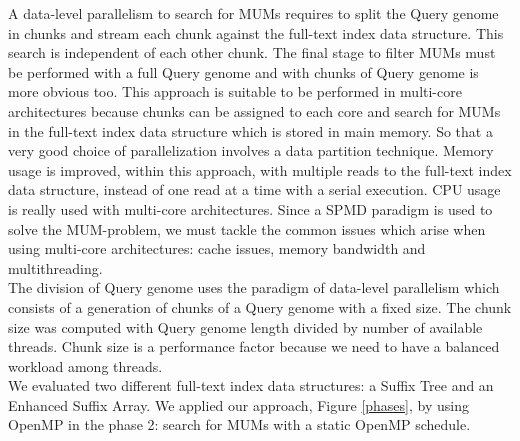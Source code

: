 \documentclass[runningheads,a4paper]{llncs}
\begin{document}
A data-level parallelism to search for MUMs requires to split the Query genome in chunks and stream each chunk against the full-text index data structure. This search is independent of each other chunk. The final stage to filter MUMs must be performed with a full Query genome and with chunks of Query genome is more obvious too. This approach is suitable to be performed in multi-core architectures because chunks can be assigned to each core and search for MUMs in the full-text index data structure which is stored in main memory. So that a very good choice of parallelization involves a data partition technique.
Memory usage is improved, within this approach, with multiple reads to the full-text index data structure, instead of one read at a time with a serial execution. CPU usage is really used with multi-core architectures. Since a SPMD paradigm is used to solve the MUM-problem, we must tackle the common issues which arise when using multi-core architectures: cache issues, memory bandwidth and multithreading.\\
The division of Query genome uses the paradigm of data-level parallelism which consists of a generation of chunks of a Query genome with a fixed size. The chunk size was computed with Query genome length divided by number of available threads. Chunk size is a performance factor because we need to have a balanced workload among threads.\\
We evaluated two different full-text index data structures: a Suffix Tree and an Enhanced Suffix Array. We applied our approach, Figure \ref{phases}, by using OpenMP in the phase 2: search for MUMs with a static OpenMP schedule.\\
\end{document}
